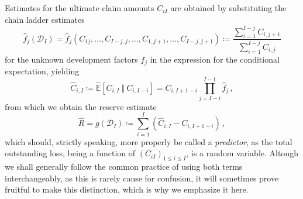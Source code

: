 \documentclass[a4paper]{book}
\theoremstyle{plain}
\begin{document}
Estimates for the ultimate claim amounts $C_{iI}$ are obtained by substituting the chain ladder estimates
\begin{equation} \label{eq:chain-ladder-estimator}
    \hat{f}_j(\mathcal{D}_I) = \hat{f}_j(C_{1j}, \dots, C_{I - j, j}, \dots, C_{1, j + 1}, \dots, C_{I - j, j + 1}) \coloneqq \frac{\sum_{i=1}^{I - j} C_{i, j + 1}}{\sum_{i=1}^{I - j} C_{i, j}}
\end{equation}
for the unknown development factors $f_j$ in the expression for the conditional expectation, yielding
\begin{equation}
    \hat{C}_{i, I} \coloneqq \hat{\mathbb{E}}[C_{i, I} \ \Vert \ C_{i, I-i}] = C_{i, I + 1 - i} \prod_{j=I-i}^{I-1} \hat{f}_j  \,,
\end{equation}
from which we obtain the reserve estimate
\begin{equation} 
    \hat{R} = g(\mathcal{D}_I) \coloneqq \sum_{i = 1}^I (\hat{C}_{i, I} - C_{i, I + 1- i}) \,, \label{eq:reserve_predictor}
\end{equation}
which should, strictly speaking, more properly be called a \emph{predictor}, as the total outstanding loss, being a function of $(C_{iI})_{1 \leq i \leq I}$, is a random variable. Altough we shall generally follow the common practice of using both terms interchangeably, as this is rarely cause for confusion, it will sometimes prove fruitful to make this distinction, which is why we emphasize it here.
\end{document}
